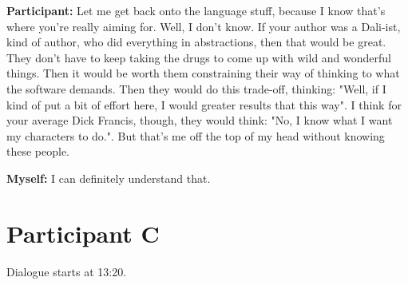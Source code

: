 \documentclass[11pt]{report}
\begin{document}
\begin{linenumbers}
\textbf{Participant:} Let me get back onto the language stuff, because I know that's where you're really aiming for. Well, I don't know. If your author was a Dali-ist, kind of author, who did everything in abstractions, then that would be great. They don't have to keep taking the drugs to come up with wild and wonderful things. Then it would be worth them constraining their way of thinking to what the software demands. Then they would do this trade-off, thinking: "Well, if I kind of put a bit of effort here, I would greater results that this way". I think for your average Dick Francis, though, they would think: "No, I know what I want my characters to do.". But that's me off the top of my head without knowing these people.

\textbf{Myself:} I can definitely understand that.
\end{linenumbers}
\resetlinenumber[1]

\section{Participant C}

Dialogue starts at 13:20.
\end{document}
